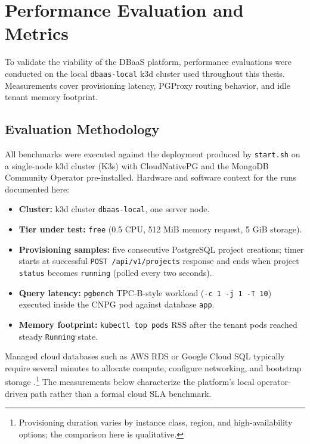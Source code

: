 \section{Performance Evaluation and Metrics}
\label{sec:performance_evaluation}

To validate the viability of the DBaaS platform, performance evaluations were conducted on the local \texttt{dbaas-local} k3d cluster used throughout this thesis. Measurements cover provisioning latency, PGProxy routing behavior, and idle tenant memory footprint.

\subsection{Evaluation Methodology}

All benchmarks were executed against the deployment produced by \texttt{start.sh} on a single-node k3d cluster (K3s) with CloudNativePG and the MongoDB Community Operator pre-installed. Hardware and software context for the runs documented here:

\begin{itemize}
    \item \textbf{Cluster:} k3d cluster \texttt{dbaas-local}, one server node.
    \item \textbf{Tier under test:} \texttt{free} (0.5 CPU, 512 MiB memory request, 5 GiB storage).
    \item \textbf{Provisioning samples:} five consecutive PostgreSQL project creations; timer starts at successful \texttt{POST /api/v1/projects} response and ends when project \texttt{status} becomes \texttt{running} (polled every two seconds).
    \item \textbf{Query latency:} \texttt{pgbench} TPC-B-style workload (\texttt{-c 1 -j 1 -T 10}) executed inside the CNPG pod against database \texttt{app}.
    \item \textbf{Memory footprint:} \texttt{kubectl top pods} RSS after the tenant pods reached steady \texttt{Running} state.
\end{itemize}

Managed cloud databases such as AWS RDS or Google Cloud SQL typically require several minutes to allocate compute, configure networking, and bootstrap storage \cite{aws_rds_provisioning}.\footnote{Provisioning duration varies by instance class, region, and high-availability options; the comparison here is qualitative.} The measurements below characterize the platform's local operator-driven path rather than a formal cloud SLA benchmark.

